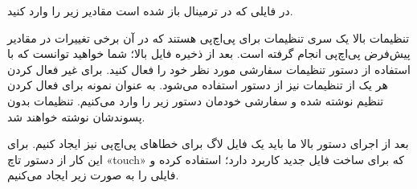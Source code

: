 در فایلی که در ترمینال باز شده است مقادیر زیر را وارد کنید.
\newline
\begin{latin}  
    
\end{latin}
تنظیمات بالا یک سری تنظیمات برای پی‌اچ‌پی هستند که در آن برخی تغییرات در مقادیر پیش‌فرض پی‌اچ‌پی انجام گرفته است. بعد از ذخیره فایل بالا؛ شما خواهید توانست که با استفاده از دستور 
 تنظیمات سفارشی مورد نظر خود را فعال کنید. برای غیر فعال کردن هر یک از تنظیمات نیز از دستور 
  استفاده می‌شود. به عنوان نمونه برای فعال کردن تنظیم نوشته شده و سفارشی خودمان دستور زیر را وارد می‌کنیم. تنظیمات بدون پسوندشان نوشته خواهند شد.
\newline
\begin{latin}  
    
\end{latin}
بعد از اجرای دستور بالا ما باید یک فایل لاگ برای خطاهای پی‌اچ‌پی نیز ایجاد کنیم. برای این کار از دستور تاچ «touch» که برای ساخت فایل جدید کاربرد دارد؛ استفاده کرده و فایلی را به صورت زیر ایجاد می‌کنیم.
\newline
\begin{latin}  
    
\end{latin}

